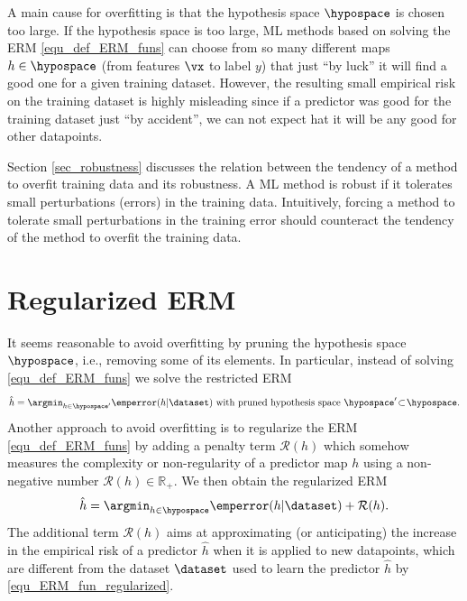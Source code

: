\documentclass[12pt]{report}
\begin{document}
A main cause for overfitting is that the hypothesis space 
$\hypospace$ is chosen too large. If the hypothesis space is 
too large, ML methods based on solving the ERM \eqref{equ_def_ERM_funs} 
can choose from so many different maps $h \in \hypospace$ 
(from features $\vx$ to label $y$) that just ``by luck'' it will find 
a good one for a given training dataset. However, the resulting 
small empirical risk on the training dataset is highly misleading 
since if a predictor was good for the training dataset just 
``by accident'', we can not expect hat it will be any good for 
other datapoints.

Section \ref{sec_robustness} discusses the relation between 
the tendency of a method to overfit training data and its robustness. 
A ML method is robust if it tolerates small perturbations (errors) 
in the training data. Intuitively, forcing a method to tolerate small 
perturbations in the training error should counteract the tendency 
of the method to overfit the training data. 

\section{Regularized ERM} 
It seems reasonable to avoid overfitting by pruning the 
hypothesis space $\hypospace$, i.e., removing some of 
its elements. In particular, instead of solving \eqref{equ_def_ERM_funs} 
we solve the restricted ERM 
\begin{equation}
\label{equ_ERM_fun_pruned}
   \hat{h} = \argmin_{h \in \hypospace'} \emperror(h|\dataset) \mbox{ with pruned hypothesis space } \hypospace' \!\subset\!\hypospace. 
\end{equation}
Another approach to avoid overfitting is to regularize the ERM \eqref{equ_def_ERM_funs} 
by adding a penalty term $\mathcal{R}(h)$ which somehow measures the complexity or 
non-regularity of a predictor map $h$ using a non-negative number $\mathcal{R}(h) \in \mathbb{R}_{+}$. 
We then obtain the regularized ERM 
\begin{equation}
\label{equ_ERM_fun_regularized}
  \hat{h} = \argmin_{h \in \hypospace} \emperror(h|\dataset)  + \mathcal{R}(h). 
\end{equation} 
The additional term $\mathcal{R}(h)$ aims at approximating 
(or anticipating) the increase in the empirical risk of a predictor 
$\hat{h}$ when it is applied to new datapoints, which are 
different from the dataset $\dataset$ used to learn the 
predictor $\hat{h}$ by \eqref{equ_ERM_fun_regularized}. 
\end{document}
